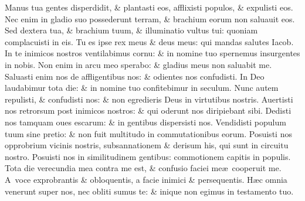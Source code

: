 \documentclass[a5paper,10pt]{book}
\def\ae{æ}
\begin{document}
\begin{multicols*}{2}
\newline \color{red} M\color{black}anus tua gentes disperdidit, \& plantasti eos, afflixisti populos, \& expulisti eos.
\newline \color{red} N\color{black}ec enim in gladio suo possederunt terram, \& brachium eorum non saluauit eos.
\newline \color{red} S\color{black}ed dextera tua, \& brachium tuum, \& illuminatio vultus tui: quoniam complacuisti in eis.
\newline \color{red} T\color{black}u es ipse rex meus \& deus meus: qui mandas salutes Iacob.
\newline \color{red} I\color{black}n te inimicos nostros ventilabimus cornu: \& in nomine tuo spernemus insurgentes in nobis.
\newline \color{red} N\color{black}on enim in arcu meo sperabo: \& gladius meus non saluabit me.
\newline \color{red} S\color{black}aluasti enim nos de affligentibus nos: \& odientes nos confudisti.
\newline \color{red} I\color{black}n Deo laudabimur tota die: \& in nomine tuo confitebimur in seculum.
\newline \color{red} N\color{black}unc autem repulisti, \& confudisti nos: \& non egredieris Deus in virtutibus nostris.
\newline \color{red} A\color{black}uertisti nos retrorsum post inimicos nostros: \& qui oderunt nos diripiebant sibi.
\newline \color{red} D\color{black}edisti nos tamquam oues escarum: \& in gentibus dispersisti nos.
\newline \color{red} V\color{black}endidisti populum tuum sine pretio: \& non fuit multitudo in commutationibus eorum.
\newline \color{red} P\color{black}osuisti nos opprobrium vicinis nostris, subsannationem \& derisum his, qui sunt in circuitu nostro.
\newline \color{red} P\color{black}osuisti nos in similitudinem gentibus: commotionem capitis in populis.
\newline \color{red} T\color{black}ota die verecundia mea contra me est, \& confusio faciei me\ae \ cooperuit me.
\newline \color{red} A\color{black}\ voce exprobrantis \& obloquentis, a facie inimici \& persequentis.
\newline \color{red} H\color{black}\ae c omnia venerunt super nos, nec obliti sumus te: \& inique non egimus in testamento tuo.

\end{multicols*}
\end{document}
